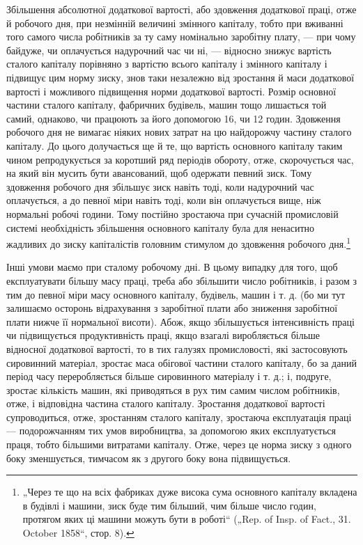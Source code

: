 Збільшення абсолютної додаткової вартості, або здовження
додаткової праці, отже й робочого дня, при незмінній величині
змінного капіталу, тобто при вживанні того самого числа робітників
за ту саму номінально заробітну плату, — при чому байдуже,
чи оплачується надурочний час чи ні, — відносно знижує
вартість сталого капіталу порівняно з вартістю всього капіталу
і змінного капіталу і підвищує цим норму зиску, знов таки
незалежно від зростання й маси додаткової вартості і можливого
підвищення норми додаткової вартості. Розмір основної
частини сталого капіталу, фабричних будівель, машин тощо лишається
той самий, однаково, чи працюють за його допомогою 16,
чи 12 годин. Здовження робочого дня не вимагає ніяких нових
затрат на цю найдорожчу частину сталого капіталу. До цього долучається
ще й те, що вартість основного капіталу таким чином репродукується
за коротший ряд періодів обороту, отже, скорочується
час, на який він мусить бути авансований, щоб одержати
певний зиск. Тому здовження робочого дня збільшує зиск навіть
тоді, коли надурочний час оплачується, а до певної міри навіть
тоді, коли він оплачується вище, ніж нормальні робочі години.
Тому постійно зростаюча при сучасній промисловій системі необхідність
збільшення основного капіталу була для ненаситно
жадливих до зиску капіталістів головним стимулом до здовження
робочого дня.\footnote{
„Через те що на всіх фабриках дуже висока сума основного капіталу
вкладена в будівлі і машини, зиск буде тим більший, чим більше число годин,
протягом яких ці машини можуть бути в роботі“ („Rep. of Insp. of Fact., 31.
October 1858“, стор. 8).
}

Інші умови маємо при сталому робочому дні. В цьому випадку
для того, щоб експлуатувати більшу масу праці, треба
або збільшити число робітників, і разом з тим до певної міри
масу основного капіталу, будівель, машин і т. д. (бо ми тут
залишаємо осторонь відрахування з заробітної плати або зниження
заробітної плати нижче її нормальної висоти). Абож, якщо
збільшується інтенсивність праці чи підвищується продуктивність
праці, якщо взагалі виробляється більше відносної додаткової
вартості, то в тих галузях промисловості, які застосовують
сировинний матеріал, зростає маса обігової частини
сталого капіталу, бо за даний період часу переробляється
більше сировинного матеріалу і т. д.; і, подруге, зростає кількість
машин, які приводяться в рух тим самим числом робітників,
отже, і відповідна частина сталого капіталу. Зростання додаткової
вартості супроводиться, отже, зростанням сталого капіталу, зростаюча
експлуатація праці — подорожчанням тих умов виробництва,
за допомогою яких експлуатується праця, тобто більшими
витратами капіталу. Отже, через це норма зиску з одного
боку зменшується, тимчасом як з другого боку вона підвищується.

